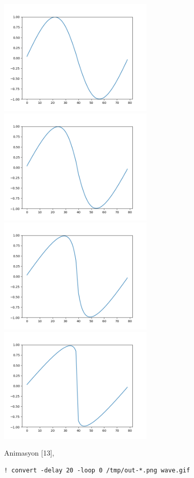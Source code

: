 \documentclass[12pt,fleqn]{article}\usepackage{../../common}
\begin{document}
\includegraphics[width=20em]{out-005.png}
\includegraphics[width=20em]{out-010.png}
\includegraphics[width=20em]{out-020.png}
\includegraphics[width=20em]{out-030.png}

Animasyon [13],

\begin{verbatim}
! convert -delay 20 -loop 0 /tmp/out-*.png wave.gif
\end{verbatim}
  
\end{document}
